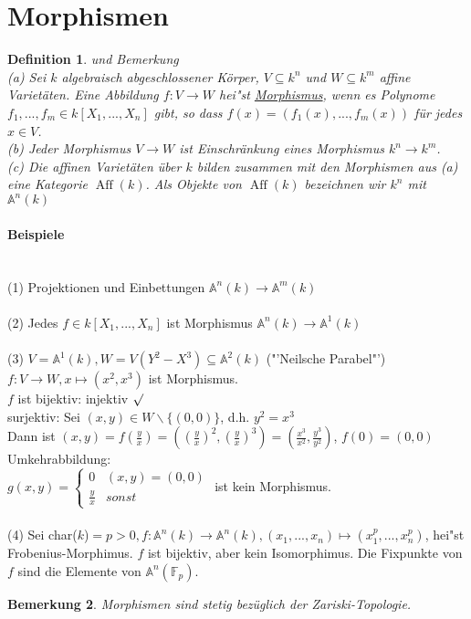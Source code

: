 \documentclass[a4paper,12pt]{report}
\theoremstyle{break}
\newtheorem{Def}{Definition}[chapter]
\newtheorem{Bem}[Def]{Bemerkung}
\theoremstyle{nonumberbreak}
\theoremstyle{nonumberplain}
\begin{document}
\section{Morphismen}
\begin{Def} und Bemerkung\\
(a) Sei $k$ algebraisch abgeschlossener Körper, $V\subseteq k^n$ und $W\subseteq k^m$ affine Varietäten. Eine Abbildung $f:V\rightarrow W$ hei"st \underline{Morphismus}, wenn es Polynome $f_1,...,f_m\in k[X_1,...,X_n]$ gibt, so dass $f(x)=(f_1(x),...,f_m(x))$ für jedes $x\in V$.\\
(b) Jeder Morphismus $V\rightarrow W$ ist Einschränkung eines Morphismus $k^n\rightarrow k^m$.\\
(c) Die affinen Varietäten über $k$ bilden zusammen mit den Morphismen aus (a) eine Kategorie $\operatorname{Aff}(k)$. Als Objekte von $\operatorname{Aff}(k)$ bezeichnen wir $k^n$ mit $\mathbb{A}^n(k)$ 
\end{Def}
\paragraph{Beispiele}~\\
(1) Projektionen und Einbettungen $\mathbb{A}^n(k) \rightarrow\mathbb{A}^m(k)$\\\\
(2) Jedes $f\in k[X_1,...,X_n]$ ist Morphismus $\mathbb{A}^n(k)\rightarrow\mathbb{A}^1(k)$\\\\
(3) $V= \mathbb{A}^1(k), W=V(Y^2-X^3)\subseteq \mathbb{A}^2(k)$ ("'Neilsche Parabel"')\\
$f: V\rightarrow W, x\mapsto (x^2,x^3)$ ist Morphismus.\\
$f$ ist bijektiv: injektiv $\surd$\\
surjektiv: Sei $(x,y)\in W\backslash\{(0,0)\}$, d.h. $y^2=x^3$\\
Dann ist $(x,y)= f(\frac{y}{x})= ((\frac{y}{x})^2,(\frac{y}{x})^3)=(\frac{x^3}{x^2},\frac{y^3}{y^2})$, $f(0) = (0,0)$\\
Umkehrabbildung:\\
$g(x,y)=\begin{cases}
0&(x,y)=(0,0)\\
\frac{y}{x}&sonst
\end{cases}$
ist kein Morphismus.\\\\
(4) Sei char($k$)$=p>0, f:\mathbb{A}^n(k)\rightarrow\mathbb{A}^n(k), (x_1,...,x_n)\mapsto (x_1^p,...,x_n^p)$, hei"st Frobenius-Morphimus. $f$ ist bijektiv, aber kein Isomorphimus. Die Fixpunkte von $f$ sind die Elemente von $\mathbb{A}^n(\mathbb{F}_p)$.
\begin{Bem}
Morphismen sind stetig bezüglich der Zariski-Topologie.
\end{Bem}
\end{document}
